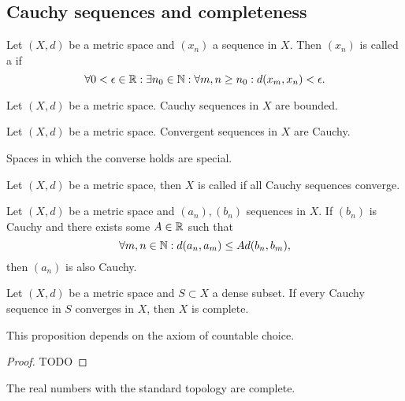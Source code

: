 \subsection{Cauchy sequences and completeness}
\begin{definition}
Let $(X,d)$ be a metric space and $(x_n)$ a sequence in $X$. Then $(x_n)$ is called a  if
\[ \forall 0 < \epsilon \in \mathbb{R}: \exists n_0\in \mathbb{N}: \forall m,n \geq n_0: d(x_m,x_n) < \epsilon.  \]
\end{definition}

\begin{lemma}
Let $(X,d)$ be a metric space. Cauchy sequences in $X$ are bounded.
\end{lemma}

\begin{proposition}
Let $(X,d)$ be a metric space. Convergent sequences in $X$ are Cauchy.
\end{proposition}
Spaces in which the converse holds are special.
\begin{definition}
Let $(X,d)$ be a metric space, then $X$ is called  if all Cauchy sequences converge.
\end{definition}

\begin{proposition} \label{CauchyCriterion}
Let $(X,d)$ be a metric space and $(a_n), (b_n)$ sequences in $X$. If $(b_n)$ is Cauchy and there exists some $A\in\mathbb{R}$ such that
\[ \forall m,n\in\mathbb{N}: d(a_n,a_m) \leq A d(b_n,b_m), \]
then $(a_n)$ is also Cauchy.
\end{proposition}

\begin{proposition} \label{completenessCriterion}
Let $(X,d)$ be a metric space and $S\subset X$ a dense subset. If every Cauchy sequence in $S$ converges in $X$, then $X$ is complete.
\end{proposition}
This proposition depends on the axiom of countable choice.
\begin{proof}
TODO
\end{proof}

\begin{lemma}
The real numbers with the standard topology are complete.
\end{lemma}

